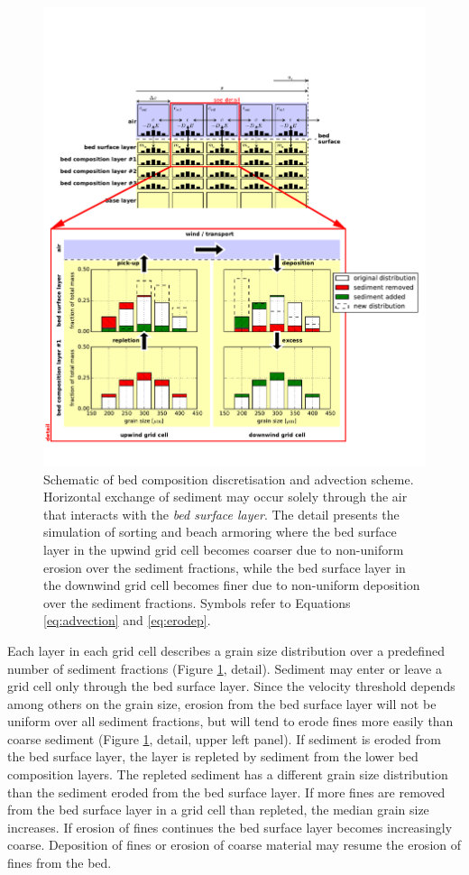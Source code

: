 \begin{figure}
  \centering
  \includegraphics[width=\columnwidth]{../Figures/bedcomposition}
  \caption{Schematic of bed composition discretisation and advection
    scheme. Horizontal exchange of sediment may occur solely through
    the air that interacts with the \textit{bed surface layer}. The
    detail presents the simulation of sorting and beach armoring where
    the bed surface layer in the upwind grid cell becomes coarser due
    to non-uniform erosion over the sediment fractions, while the bed
    surface layer in the downwind grid cell becomes finer due to
    non-uniform deposition over the sediment fractions. Symbols refer
    to Equations \ref{eq:advection} and \ref{eq:erodep}.}
  \label{fig:bedcomposition}
\end{figure}

Each layer in each grid cell describes a grain size distribution over
a predefined number of sediment fractions (Figure
\ref{fig:bedcomposition}, detail). Sediment may enter or leave a grid
cell only through the bed surface layer. Since the velocity threshold
depends among others on the grain size, erosion from the bed surface
layer will not be uniform over all sediment fractions, but will tend
to erode fines more easily than coarse sediment (Figure
\ref{fig:bedcomposition}, detail, upper left panel). If sediment is
eroded from the bed surface layer, the layer is repleted by sediment
from the lower bed composition layers. The repleted sediment has a
different grain size distribution than the sediment eroded from the
bed surface layer. If more fines are removed from the bed surface
layer in a grid cell than repleted, the median grain size
increases. If erosion of fines continues the bed surface layer becomes
increasingly coarse. Deposition of fines or erosion of coarse material
may resume the erosion of fines from the bed.

